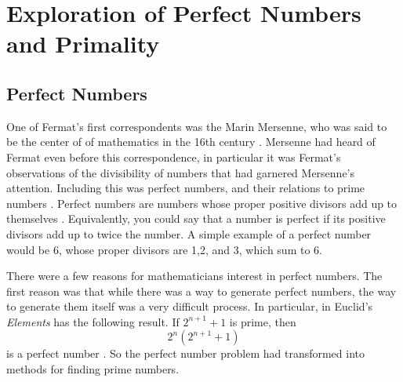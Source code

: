 \documentclass[11pt]{article}
\begin{document}
\section*{Exploration of Perfect Numbers and Primality}
\subsection*{Perfect Numbers}
One of Fermat's first correspondents was the Marin Mersenne, who was said to be
the center of of mathematics in the 16th century \cite{Mersenne}.
Mersenne had heard of Fermat even before this correspondence, in particular it
was Fermat's observations of the divisibility of numbers that had garnered 
Mersenne's attention.
Including this was perfect numbers, and their relations to prime
numbers \cite{Mahoney}.
Perfect numbers are numbers whose proper positive divisors add up to
themselves \cite{PerfectNumbers}.
Equivalently, you could say that a number is perfect if its positive divisors
add up to twice the number.
A simple example of a perfect number would be 6, whose proper divisors are
1,2, and 3, which sum to 6.

There were a few reasons for mathematicians interest in perfect numbers.
The first reason was that while there was a way to generate perfect numbers,
the way to generate them itself was a very difficult process.
In particular, in Euclid's \emph{Elements} has the following result.
If $2^{n+1} + 1$ is prime, then \[ 2^n(2^{n+1} + 1)\]
is a perfect number \cite{Euclid,Mahoney}.
So the perfect number problem had transformed into methods for
finding prime numbers.
\end{document}
